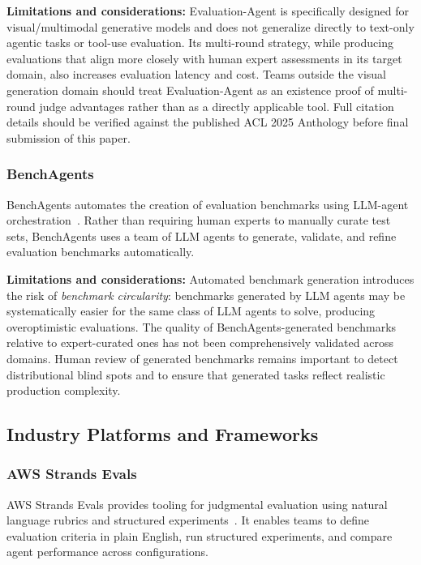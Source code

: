 \textbf{Limitations and considerations:} Evaluation-Agent is specifically designed for visual/multimodal generative models and does not generalize directly to text-only agentic tasks or tool-use evaluation. Its multi-round strategy, while producing evaluations that align more closely with human expert assessments in its target domain, also increases evaluation latency and cost. Teams outside the visual generation domain should treat Evaluation-Agent as an existence proof of multi-round judge advantages rather than as a directly applicable tool. Full citation details should be verified against the published ACL 2025 Anthology before final submission of this paper.

\subsubsection{BenchAgents}

BenchAgents automates the creation of evaluation benchmarks using LLM-agent orchestration~\citep{benchagents}. Rather than requiring human experts to manually curate test sets, BenchAgents uses a team of LLM agents to generate, validate, and refine evaluation benchmarks automatically.

\textbf{Limitations and considerations:} Automated benchmark generation introduces the risk of \textit{benchmark circularity}: benchmarks generated by LLM agents may be systematically easier for the same class of LLM agents to solve, producing overoptimistic evaluations. The quality of BenchAgents-generated benchmarks relative to expert-curated ones has not been comprehensively validated across domains. Human review of generated benchmarks remains important to detect distributional blind spots and to ensure that generated tasks reflect realistic production complexity.

\subsection{Industry Platforms and Frameworks}

\subsubsection{AWS Strands Evals}

AWS Strands Evals provides tooling for judgmental evaluation using natural language rubrics and structured experiments~\citep{strands_evals}. It enables teams to define evaluation criteria in plain English, run structured experiments, and compare agent performance across configurations.

